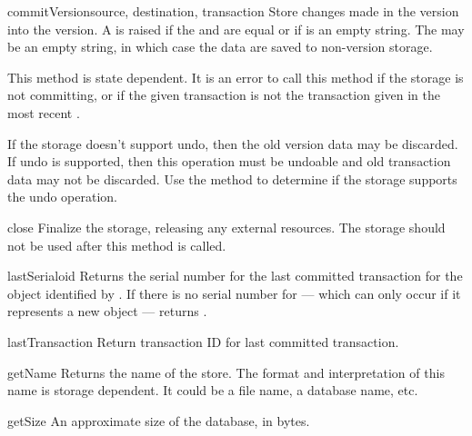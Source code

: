 \documentclass{howto}
\begin{document}
\begin{methoddesc}{commitVersion}{source, destination, transaction}
  Store changes made in the  version into the
   version.  A  is
  raised if the  and  are equal or if
   is an empty string.  The  may be an
  empty string, in which case the data are saved to non-version
  storage.

  This method is state dependent.  It is an error to call this method
  if the storage is not committing, or if the given transaction is not
  the transaction given in the most recent .

  If the storage doesn't support undo, then the old version data may
  be discarded.  If undo is supported, then this operation must be
  undoable and old transaction data may not be discarded.  Use the
   method to determine if the storage supports
  the undo operation.
\end{methoddesc}

\begin{methoddesc}{close}{}
  Finalize the storage, releasing any external resources.  The storage
  should not be used after this method is called.
\end{methoddesc}

\begin{methoddesc}{lastSerial}{oid}
  Returns the serial number for the last committed transaction for the
  object identified by .  If there is no serial number for
   --- which can only occur if it represents a new object ---
  returns .
\end{methoddesc}

\begin{methoddesc}{lastTransaction}{}
  Return transaction ID for last committed transaction.
\end{methoddesc}

\begin{methoddesc}{getName}{}
  Returns the name of the store.  The format and interpretation of
  this name is storage dependent.  It could be a file name, a database
  name, etc.
\end{methoddesc}

\begin{methoddesc}{getSize}{}
  An approximate size of the database, in bytes.
\end{methoddesc}
\end{document}
